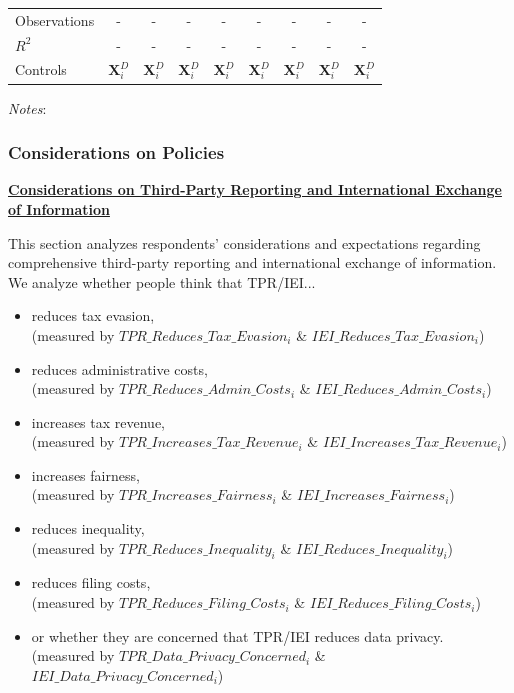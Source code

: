 \documentclass[11pt]{article}
\begin{document}
\begin{landscape}
\begin{table}[!htbp]
\begin{threeparttable}
\begin{tabular}{l||ccc||ccc||cc}
\midrule
Observations                        &-    &-    &-    &-    &-    &-    &-  &- \\
$R^2$                               &-    &-    &-    &-    &-    &-    &-  &- \\
Controls                 &  $\mathbf{X}_{i}^{D}$  &  $\mathbf{X}_{i}^{D}$&  $\mathbf{X}_{i}^{D}$&  $\mathbf{X}_{i}^{D}$&  $\mathbf{X}_{i}^{D}$&  $\mathbf{X}_{i}^{D}$&  $\mathbf{X}_{i}^{D}$ &  $\mathbf{X}_{i}^{D}$     \\
\bottomrule
\end{tabular}
\begin{tablenotes}[flushleft]
\footnotesize
\item \textit{Notes}:   
\end{tablenotes}
\end{threeparttable}
\end{table}
\end{landscape}

\subsubsection{Considerations on Policies}
\begin{center}\textbf{\underline{Considerations on Third-Party Reporting and International Exchange of Information}}\end{center}
This section analyzes respondents’ considerations and expectations regarding comprehensive third-party reporting and international exchange of information. We analyze whether people think that TPR/IEI...
\begin{itemize}
    \item reduces tax evasion, \\(measured by $TPR\_Reduces\_Tax\_Evasion_i$ \& $IEI\_Reduces\_Tax\_Evasion_i$)
    \item reduces administrative costs, \\(measured by $TPR\_Reduces\_Admin\_Costs_i$ \& $IEI\_Reduces\_Admin\_Costs_i$)
    \item increases tax revenue, \\(measured by $TPR\_Increases\_Tax\_Revenue_i$ \& $IEI\_Increases\_Tax\_Revenue_i$)
    \item increases fairness, \\(measured by $TPR\_Increases\_Fairness_i$ \& $IEI\_Increases\_Fairness_i$)
    \item reduces inequality, \\(measured by $TPR\_Reduces\_Inequality_i$ \& $IEI\_Reduces\_Inequality_i$)
    \item reduces filing costs, \\(measured by $TPR\_Reduces\_Filing\_Costs_i$ \& $IEI\_Reduces\_Filing\_Costs_i$)
    \item or whether they are concerned that TPR/IEI reduces data privacy. \\(measured by $TPR\_Data\_Privacy\_Concerned_i$ \& $IEI\_Data\_Privacy\_Concerned_i$)
\end{itemize}
\end{document}
